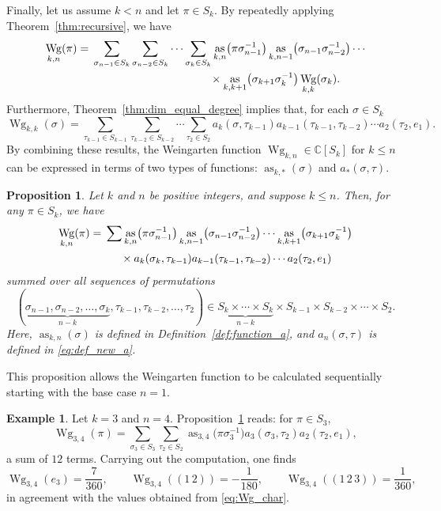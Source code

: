 \documentclass[pdftex]{sigma}
\numberwithin{equation}{section}
\newtheorem{Proposition}[Theorem]{Proposition}
\theoremstyle{definition}
\newtheorem{Example}[Theorem]{Example}
\DeclareMathOperator{\Raise}{as}
\DeclareMathOperator{\Wg}{Wg}
\begin{document}
Finally, let us assume $k<n$ and let $\pi \in S_k$.
By repeatedly applying Theorem~\ref{thm:recursive}, we have
\begin{align*}
\Wg_{k,n}(\pi)={}& \sum_{\sigma_{n-1} \in S_k} \sum_{\sigma_{n-2} \in S_k} \cdots \sum_{\sigma_{k} \in S_k}
\Raise_{k,n} \bigl(\pi\sigma_{n-1}^{-1}\bigr) \Raise_{k,n-1} \bigl(\sigma_{n-1}\sigma_{n-2}^{-1}\bigr) \cdots \\
& \hphantom{\sum_{\sigma_{n-1} \in S_k} \sum_{\sigma_{n-2} \in S_k} \cdots \sum_{\sigma_{k} \in S_k}}{}
 \times
\Raise_{k,k+1} \bigl(\sigma_{k+1}\sigma_{k}^{-1}\bigr) \Wg_{k,k} (\sigma_{k}).
\end{align*}
Furthermore, Theorem~\ref{thm:dim_equal_degree} implies that, for each $\sigma \in S_{k}$
\[
\Wg_{k,k}(\sigma) = \sum_{\tau_{k-1} \in S_{k-1}}
\sum_{\tau_{k-2} \in S_{k-2}} \cdots \sum_{\tau_{2} \in S_2}
a_k(\sigma, \tau_{k-1}) a_{k-1}(\tau_{k-1}, \tau_{k-2}) \cdots a_2(\tau_{2}, e_1).
\]
By combining these results, the Weingarten function $\Wg_{k,n} \in \mathbb{C}[S_k]$ for $k \le n$ can be expressed in terms of two types of functions: $\Raise_{k,*}(\sigma)$ and $a_*(\sigma,\tau)$.

\begin{Proposition} \label{prop:Wg_asasas}
Let $k$ and $n$ be positive integers, and suppose $k \le n$.
Then, for any $\pi \in S_k$, we have
\begin{align*}
\Wg_{k,n}(\pi)={}& \sum \Raise_{k,n} \bigl(\pi\sigma_{n-1}^{-1}\bigr) \Raise_{k,n-1} \bigl(\sigma_{n-1} \sigma_{n-2}^{-1}\bigr) \cdots \Raise_{k,k+1} \bigl(\sigma_{k+1}\sigma_{k}^{-1}\bigr) \\
& \hphantom{\sum}{} \times a_k(\sigma_k, \tau_{k-1}) a_{k-1}(\tau_{k-1}, \tau_{k-2}) \cdots a_2(\tau_{2}, e_1)
\end{align*}
summed over all sequences of permutations
\[
(\underbrace{\sigma_{n-1}, \sigma_{n-2}, \dots, \sigma_{k}}_{n-k}, \tau_{k-1},\tau_{k-2},\dots, \tau_2) \in \underbrace{S_k \times \cdots \times S_k}_{n-k} \times S_{k-1} \times S_{k-2} \times \cdots \times S_2.
\]
Here, $\Raise_{k,n}(\sigma)$ is defined in Definition~{\rm \ref{def:function_a}}, and $a_n
(\sigma,\tau)$ is defined in \eqref{eq:def_new_a}.
\end{Proposition}

This proposition allows the Weingarten function to be calculated sequentially starting with the base case $n=1$.

%
\begin{Example}
Let $k=3$ and $n=4$. Proposition~\ref{prop:Wg_asasas} reads: for $\pi \in S_3$,
\[
\Wg_{3,4}(\pi) = \sum_{\sigma_3 \in S_3} \sum_{\tau_2 \in S_2}
\Raise_{3,4}\bigl(\pi \sigma_3^{-1}\bigr) a_3(\sigma_3,\tau_2) a_2(\tau_2, e_1),
\]
a sum of $12$ terms. Carrying out the computation, one finds
\[
\Wg_{3,4}(e_3)=\frac{7}{360}, \qquad
\Wg_{3,4}((1\,2))=-\frac{1}{180}, \qquad
\Wg_{3,4}((1\,2\,3))=\frac{1}{360},
\]
in agreement with the values obtained from \eqref{eq:Wg_char}.
\end{Example}
\end{document}
